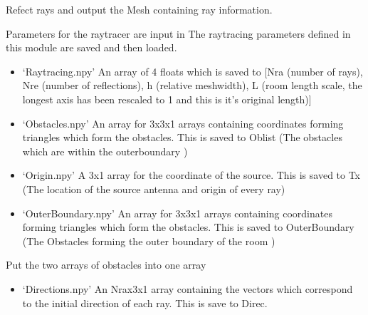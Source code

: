 \documentclass[letterpaper,10pt,english]{sphinxmanual}
\begin{document}
\begin{fulllineitems}
\label{\detokenize{index:RayTracerMainProgram.MeshProgram}}
Refect rays and output the Mesh containing ray information.

Parameters for the raytracer are input in {\hyperref[\detokenize{index:module-ParameterInput}]{}}
The raytracing parameters defined in this module are saved and then loaded.
\begin{itemize}
\item {} 
‘Raytracing.npy’ \sphinxhyphen{} An array of 4 floats which is saved to   {[}Nra (number of rays), Nre (number of reflections),   h (relative meshwidth),   L (room length scale, the longest axis has been rescaled to 1 and this   is it’s original length){]}

\item {} 
‘Obstacles.npy’  \sphinxhyphen{} An array for 3x3x1 arrays containing co\sphinxhyphen{}ordinates   forming triangles which form the obstacles. This is saved to Oblist   (The obstacles which are within the outerboundary )

\item {} 
‘Origin.npy’     \sphinxhyphen{} A 3x1 array for the co\sphinxhyphen{}ordinate of the source.   This is saved to Tx  (The location of the source antenna and origin   of every ray)

\item {} 
‘OuterBoundary.npy’ \sphinxhyphen{} An array for 3x3x1 arrays containing   co\sphinxhyphen{}ordinates forming triangles which form the obstacles. This is   saved to OuterBoundary   (The Obstacles forming the outer boundary of   the room )

\end{itemize}

Put the two arrays of obstacles into one array

\begin{sphinxVerbatim}[commandchars=\\\{\}]
\PYG{p}{[}\PYG{p}{]}
\end{sphinxVerbatim}
\begin{itemize}
\item {} 
‘Directions.npy’ \sphinxhyphen{} An Nrax3x1 array containing the vectors which   correspond to the initial direction of each ray. This is save to Direc.


\end{itemize}
\end{fulllineitems}
\end{document}
